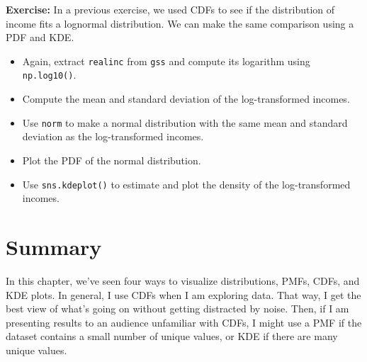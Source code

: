 \textbf{Exercise:} In a previous exercise, we used CDFs to see if the
distribution of income fits a lognormal distribution. We can make the
same comparison using a PDF and KDE.

\begin{itemize}
\item
  Again, extract \passthrough{\lstinline!realinc!} from
  \passthrough{\lstinline!gss!} and compute its logarithm using
  \passthrough{\lstinline!np.log10()!}.
\item
  Compute the mean and standard deviation of the log-transformed
  incomes.
\item
  Use \passthrough{\lstinline!norm!} to make a normal distribution with
  the same mean and standard deviation as the log-transformed incomes.
\item
  Plot the PDF of the normal distribution.
\item
  Use \passthrough{\lstinline!sns.kdeplot()!} to estimate and plot the
  density of the log-transformed incomes.
\end{itemize}

\hypertarget{summary}{%
\section{Summary}\label{summary}}

In this chapter, we've seen four ways to visualize distributions, PMFs,
CDFs, and KDE plots. In general, I use CDFs when I am exploring data.
That way, I get the best view of what's going on without getting
distracted by noise. Then, if I am presenting results to an audience
unfamiliar with CDFs, I might use a PMF if the dataset contains a small
number of unique values, or KDE if there are many unique values.


